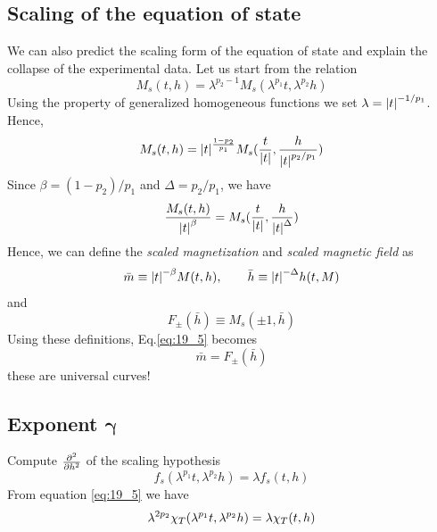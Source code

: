 \documentclass[../main/main.tex]{subfiles}
\begin{document}
\subsection{Scaling of the equation of state}
We can also predict the scaling form of the equation of state and explain the collapse of the experimental data. Let us start from the relation
\begin{equation*}
  M_s (t,h) = \lambda ^{p_2 - 1} M_s (\lambda ^{p_1} t, \lambda ^{p_2} h)
\end{equation*}
Using the property of generalized homogeneous functions we set \( \lambda = \abs{t}^{-1/p_1}  \). Hence,
\begin{equation*}
  M_s (t,h) = \abs{t}^{\frac{1-p_2}{p_1}} M_s ( \frac{t}{\abs{t} }, \frac{h}{\abs{t}^{p_2/p_1 } })
\end{equation*}
Since \( \beta = (1-p_2)/p_1 \) and \( \Delta = p_2/p_1 \), we have
\begin{equation}
  \frac{M_s (t,h)}{\abs{t}^{\beta } } = M_s ( \frac{t}{\abs{t} }, \frac{h}{\abs{t}^{\Delta } })
  \label{eq:19_5}
\end{equation}
Hence, we can define the \emph{scaled magnetization} and \emph{scaled magnetic field}  as
\begin{equation}
    \bar{m} \equiv \abs{t}^{-\beta } M(t,h), \qquad \bar{h} \equiv \abs{t}^{-\Delta } h (t,M)
\end{equation}
and
\begin{equation}
  F_{\pm} ( \bar{h} ) \equiv M_s (\pm1, \bar{h} )
\end{equation}
Using these definitions, Eq.\eqref{eq:19_5} becomes
\begin{equation}
  \bar{m} = F_{\pm} (\bar{h} )
\end{equation}
these are universal curves!




\subsection{Exponent \( \pmb{\gamma  } \) }
Compute \( \pdv[2]{}{h}  \) of the scaling hypothesis
\begin{equation}
  f_s ( \lambda^{p_1} t, \lambda ^{p_2}h) = \lambda f_s (t,h)
\end{equation}
From equation \eqref{eq:19_5} we have
\begin{equation}
  \lambda ^{2p_2} \chi _T \qty(\lambda ^{p_1}t, \lambda ^{p_2}h) = \lambda \chi _T (t,h)
\end{equation}
\end{document}
